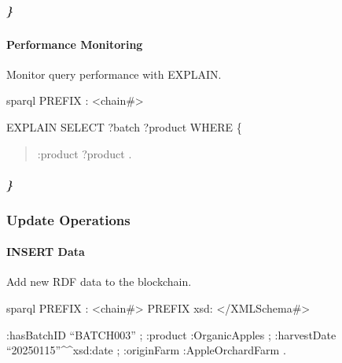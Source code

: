 \documentclass[letterpaper,10pt,english]{sphinxmanual}
\begin{document}
\subparagraph{\}}
\label{\detokenize{api/sparql-api:id105}}

\paragraph{Performance Monitoring}
\label{\detokenize{api/sparql-api:performance-monitoring}}
\sphinxAtStartPar
Monitor query performance with EXPLAIN.

\sphinxAtStartPar
{}
{\color{red}\bfseries{}\textasciigrave{}\textasciigrave{}}{\color{red}\bfseries{}\textasciigrave{}}sparql
PREFIX : \textless{}\sphinxhyphen{}chain\#\textgreater{}

\sphinxAtStartPar
EXPLAIN
SELECT ?batch ?product WHERE \{
\begin{quote}
\begin{description}
\sphinxAtStartPar
:product ?product .

\end{description}
\end{quote}


\subparagraph{\}}
\label{\detokenize{api/sparql-api:id110}}

\subsubsection{Update Operations}
\label{\detokenize{api/sparql-api:update-operations}}

\paragraph{INSERT Data}
\label{\detokenize{api/sparql-api:insert-data}}
\sphinxAtStartPar
Add new RDF data to the blockchain.

\sphinxAtStartPar
{}
{\color{red}\bfseries{}\textasciigrave{}\textasciigrave{}}{\color{red}\bfseries{}\textasciigrave{}}sparql
PREFIX : \textless{}\sphinxhyphen{}chain\#\textgreater{}
PREFIX xsd: \textless{}/XMLSchema\#\textgreater{}
\begin{description}
\begin{description}
\sphinxAtStartPar
:hasBatchID “BATCH\sphinxhyphen{}003” ;
:product :OrganicApples ;
:harvestDate “2025\sphinxhyphen{}01\sphinxhyphen{}15”\textasciicircum{}\textasciicircum{}xsd:date ;
:originFarm :AppleOrchardFarm .

\end{description}

\end{description}
\end{document}

